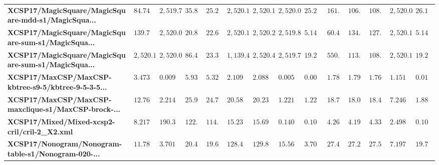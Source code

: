 \begin{tabular}{llllllllllllll}
\textbf{XCSP17/MagicSquare/MagicSquare-mdd-s1/MagicSqua...} &         $84.7464$ &   $2,519.77$ &      $35.853$ &       $25.2596$ &                                 $2,520.15$ &                               $2,520.1$ &          $2,520.02$ &   $25.2596$ &               $161.423$ &                $106.59$ &                $108.46$ &              $2,520.06$ &   $26.1013$ \\
\textbf{XCSP17/MagicSquare/MagicSquare-sum-s1/MagicSqua...} &         $139.782$ &   $2,520.01$ &      $20.818$ &       $22.6059$ &                                 $2,520.14$ &                              $2,520.27$ &          $2,519.87$ &   $5.14231$ &               $60.4123$ &               $134.038$ &               $127.858$ &              $2,520.12$ &   $5.14231$ \\
\textbf{XCSP17/MagicSquare/MagicSquare-sum-s1/MagicSqua...} &        $2,520.12$ &   $2,520.02$ &     $86.4688$ &       $23.3856$ &                                  $1,139.4$ &                              $2,520.48$ &           $2,519.7$ &   $19.2013$ &               $550.449$ &               $113.146$ &               $108.313$ &               $2,520.1$ &   $19.2013$ \\
\textbf{XCSP17/MaxCSP/MaxCSP-kbtree-s9-5/kbtree-9-5-3-5...} &         $3.47354$ &    $0.00976$ &     $5.93293$ &       $5.32137$ &                                  $2.10905$ &                               $2.08807$ &           $0.00595$ &   $0.00595$ &               $1.78868$ &               $1.79691$ &               $1.76966$ &                $1.1518$ &  $0.013523$ \\
\textbf{XCSP17/MaxCSP/MaxCSP-maxclique-s1/MaxCSP-brock-...} &         $12.7658$ &    $2.21402$ &     $25.9518$ &       $24.7375$ &                                  $20.5897$ &                                $20.234$ &           $1.22127$ &   $1.22127$ &               $18.7945$ &               $18.0665$ &               $18.4527$ &               $7.24687$ &   $1.88812$ \\
\textbf{XCSP17/Mixed/Mixed-xcsp2-cril/cril-2_X2.xml       } &         $8.21763$ &     $190.35$ &     $122.641$ &       $114.052$ &                                  $15.2334$ &                               $15.6965$ &          $0.140374$ &  $0.104318$ &               $4.26208$ &               $4.19313$ &               $4.33886$ &               $2.49836$ &  $0.104318$ \\
\textbf{XCSP17/Nonogram/Nonogram-table-s1/Nonogram-020-...} &         $11.7814$ &    $3.70108$ &      $20.448$ &       $19.6439$ &                                  $128.484$ &                               $129.804$ &           $15.5669$ &   $3.70108$ &               $27.4415$ &               $27.2893$ &               $27.5183$ &               $7.19762$ &   $19.7381$ \\

\end{tabular}
